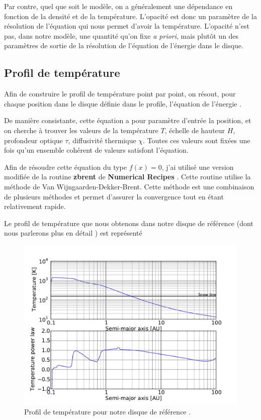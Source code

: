Par contre, quel que soit le modèle, on a généralement une dépendance en fonction de la densité et de la température. L'opacité est donc un paramètre de la résolution de l'équation qui nous permet d'avoir la température. L'opacité n'est pas, dans notre modèle, une quantité qu'on fixe \textit{a priori}, mais plutôt un des paramètres de sortie de la résolution de l'équation de l'énergie dans le disque.

\subsection{Profil de température}
Afin de construire le profil de température point par point, on résout, pour chaque position dans le disque définie dans le profile, l'équation de l'énergie . 

De manière consistante, cette équation a pour paramètre d'entrée la position, et on cherche à trouver les valeurs de la température $T$, échelle de hauteur $H$, profondeur optique $\tau$, diffusivité thermique $\chi$. Toutes ces valeurs sont fixées une fois qu'un ensemble cohérent de valeurs satisfont l'équation.

Afin de résoudre cette équation du type $f(x)=0$, j'ai utilisé une version modifiée de la routine \textbf{zbrent} de \textbf{Numerical Recipes} \citep{press1992numerical}. Cette routine utilise la méthode de Van Wijngaarden-Dekker-Brent. Cette méthode est une combinaison de plusieurs méthodes et permet d'assurer la convergence tout en étant relativement rapide.

Le profil de température que nous obtenons dans notre disque de référence (dont nous parlerons plus en détail ) est représenté 

\begin{figure}[htb]
\centering
\includegraphics[width=0.75\linewidth]{figure/fiducial_temperature_profile.pdf}
\caption{Profil de température pour notre disque de référence \protect{}.}\label{fig:fiducial_temperature}
\end{figure}

